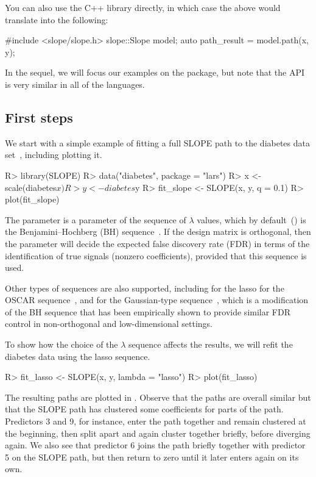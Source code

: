 \documentclass[article]{jss}
\let\Cref\crtCref
\begin{document}
\medskip

You can also use the C++ library directly, in
which case the above would translate into the
following:
\begin{Code}
#include <slope/slope.h>
slope::Slope model;
auto path_result = model.path(x, y);
\end{Code}

In the sequel, we will focus our examples on the  package, but
note that the API is very similar in all of the languages.

\subsection{First steps}

We start with a simple example of fitting a full SLOPE path to the diabetes
data set~\citep{efron2004}, including plotting it.

\begin{Code}
R> library(SLOPE)
R> data("diabetes", package = "lars")
R> x <- scale(diabetes$x)
R> y <- diabetes$y
R> fit_slope <- SLOPE(x, y, q = 0.1)
R> plot(fit_slope)
\end{Code}

The  parameter is a parameter of the sequence of \(\lambda\) values,
which by default~() is the Benjamini--Hochberg (BH)
sequence~\citep{bogdan2015}. If the design matrix is orthogonal, then the
 parameter will decide the expected false discovery rate (FDR) in terms
of the identification of true signals (nonzero coefficients), provided
that this sequence is used.

Other types of sequences are also supported,
including  for the lasso
 for the OSCAR sequence~\citep{bondell2008}, and
 for the Gaussian-type sequence~\citep{bogdan2015},
which is a modification of the BH sequence that has been empirically shown to
provide similar FDR control in non-orthogonal and low-dimensional settings.

To show how the choice of the \(\lambda\) sequence affects the
results, we will refit the diabetes data using the lasso sequence.

\begin{Code}
R> fit_lasso <- SLOPE(x, y, lambda = "lasso")
R> plot(fit_lasso)
\end{Code}

The resulting paths are plotted in \Cref{fig:diabetes}. Observe that the
paths are overall similar but that the SLOPE path has clustered
some coefficients for parts of the path. Predictors 3 and 9, for instance,
enter the path together and remain clustered at the beginning, then
split apart and again cluster together briefly, before diverging again.
We also see that predictor 6 joins the path briefly together
with predictor 5 on the SLOPE path, but then return to zero until
it later enters again on its own.
\end{document}

